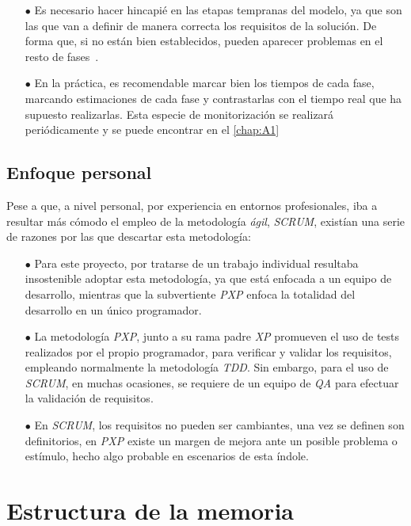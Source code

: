 \begin{itemize}
   \item[$\bullet$] Es necesario hacer hincapié en las etapas tempranas del modelo, ya que son
   las que van a definir de manera correcta los requisitos de la solución. De forma que, si no están bien establecidos, pueden 
   aparecer problemas en el resto de fases~\cite{wiegers2013software}.
   \item[$\bullet$] En la práctica, es recomendable marcar bien los tiempos de cada fase, marcando estimaciones de cada fase y contrastarlas con
   el tiempo real que ha supuesto realizarlas. Esta especie de monitorización se realizará periódicamente y se puede encontrar 
   en el \autoref{chap:A1}
\end{itemize}

\subsection{Enfoque personal}

Pese a que, a nivel personal, por experiencia en entornos profesionales, iba a resultar más cómodo el empleo de la metodología \textit{ágil}, \textit{SCRUM},
existían una serie de razones por las que descartar esta metodología:


\begin{itemize}
   \item[$\bullet$] Para este proyecto, por tratarse de un trabajo individual resultaba insostenible adoptar esta metodología,
   ya que está enfocada a un equipo de desarrollo, mientras que la subvertiente \textit{PXP} enfoca
   la totalidad del desarrollo en un único programador.
   \item[$\bullet$] La metodología \textit{PXP}, junto a su rama padre \textit{XP} promueven el uso de
   tests realizados por el propio programador, para verificar y validar los requisitos, empleando normalmente la metodología \textit{TDD}. Sin embargo, para
   el uso de \textit{SCRUM}, en muchas ocasiones, se requiere de un equipo de \textit{QA} para efectuar la validación de requisitos.
   \item[$\bullet$] En \textit{SCRUM}, los requisitos no pueden ser cambiantes, una vez se definen son definitorios,
   en \textit{PXP} existe un margen de mejora ante un posible problema o estímulo, hecho algo probable en
   escenarios de esta índole.
\end{itemize}



\section{Estructura de la memoria} %

